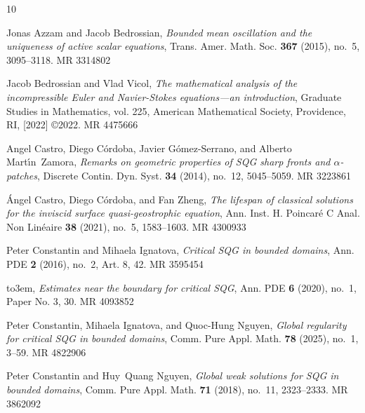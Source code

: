 \documentclass[10pt]{amsart}
\providecommand{\bysame}{\leavevmode\hbox to3em{\hrulefill}\thinspace}
\providecommand{\MR}{\relax\ifhmode\unskip\space\fi MR }
\providecommand{\MRhref}[2]{%
	\href{http://www.ams.org/mathscinet-getitem?mr=#1}{#2}
}
\providecommand{\href}[2]{#2}
\providecommand{\bysame}{\leavevmode\hbox to3em{\hrulefill}\thinspace}
\providecommand{\MR}{\relax\ifhmode\unskip\space\fi MR }
\providecommand{\MRhref}[2]{%
	\href{http://www.ams.org/mathscinet-getitem?mr=#1}{#2}
}
\providecommand{\href}[2]{#2}
\theoremstyle{definition}
\theoremstyle{remark}
\numberwithin{equation}{section}
\newcommand{\0}{\emptyset}
\begin{document}
		
		\providecommand{\bysame}{\leavevmode\hbox to3em{\hrulefill}\thinspace}
		\providecommand{\MR}{\relax\ifhmode\unskip\space\fi MR }
		\providecommand{\MRhref}[2]{%
			\href{http://www.ams.org/mathscinet-getitem?mr=#1}{#2}
		}
		\providecommand{\href}[2]{#2}
		\begin{thebibliography}{10}
			
			Jonas Azzam and Jacob Bedrossian, \emph{Bounded mean oscillation and the
				uniqueness of active scalar equations}, Trans. Amer. Math. Soc. \textbf{367}
			(2015), no.~5, 3095--3118. \MR{3314802}
			
			Jacob Bedrossian and Vlad Vicol, \emph{The mathematical analysis of the
				incompressible {E}uler and {N}avier-{S}tokes equations---an introduction},
			Graduate Studies in Mathematics, vol. 225, American Mathematical Society,
			Providence, RI, [2022] \copyright 2022. \MR{4475666}
			
			Angel Castro, Diego C\'{o}rdoba, Javier G\'{o}mez-Serrano, and Alberto
			Mart\'{\i}n~Zamora, \emph{Remarks on geometric properties of {SQG} sharp
				fronts and {$\alpha$}-patches}, Discrete Contin. Dyn. Syst. \textbf{34}
			(2014), no.~12, 5045--5059. \MR{3223861}
			
			\'Angel Castro, Diego C\'ordoba, and Fan Zheng, \emph{The lifespan of classical
				solutions for the inviscid surface quasi-geostrophic equation}, Ann. Inst. H.
			Poincar\'e{} C Anal. Non Lin\'eaire \textbf{38} (2021), no.~5, 1583--1603.
			\MR{4300933}
			
			Peter Constantin and Mihaela Ignatova, \emph{Critical {SQG} in bounded
				domains}, Ann. PDE \textbf{2} (2016), no.~2, Art. 8, 42. \MR{3595454}
			
			\bysame, \emph{Estimates near the boundary for critical {SQG}}, Ann. PDE
			\textbf{6} (2020), no.~1, Paper No. 3, 30. \MR{4093852}
			
			Peter Constantin, Mihaela Ignatova, and Quoc-Hung Nguyen, \emph{Global
				regularity for critical {SQG} in bounded domains}, Comm. Pure Appl. Math.
			\textbf{78} (2025), no.~1, 3--59. \MR{4822906}
			
			Peter Constantin and Huy~Quang Nguyen, \emph{Global weak solutions for {SQG} in
				bounded domains}, Comm. Pure Appl. Math. \textbf{71} (2018), no.~11,
			2323--2333. \MR{3862092}
			

\end{thebibliography}
\end{document}
